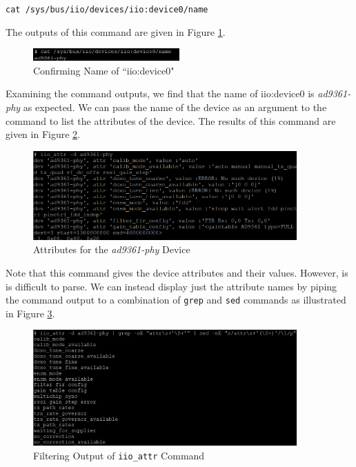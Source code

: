 \documentclass{article}
\begin{document}
\begin{center}
\texttt{cat /sys/bus/iio/devices/iio:device0/name}
\end{center}

The outputs of this command are given in Figure \ref{fig::iio_device0_name}.

\begin{figure}[H]
	\centerline{\includegraphics[width=0.5\textwidth]{iio_device0_name.png}}
	\caption{Confirming Name of ``iio:device0"}
	\label{fig::iio_device0_name}
\end{figure}

Examining the command outputs, we find that the name of iio:device0 is \textit{ad9361-phy} as expected. We can pass the name of the device as an argument to the  command to list the attributes of the device. The results of this command are given in Figure \ref{fig::iio_raw_attributes}.

\begin{figure}[H]
	\centerline{\includegraphics[width=0.9\textwidth]{iio_raw_attributes.png}}
	\caption{Attributes for the \textit{ad9361-phy} Device}
	\label{fig::iio_raw_attributes}
\end{figure}

Note that this command gives the device attributes and their values. However, is is difficult to parse. We can instead display just the attribute names by piping the command output to a combination of \texttt{grep} and \texttt{sed} commands as illustrated in Figure \ref{fig::iio_filtered_attributes}.

\begin{figure}[H]
	\centerline{\includegraphics[width=0.9\textwidth]{iio_filtered_attributes.png}}
	\caption{Filtering Output of \texttt{iio\_attr} Command}
	\label{fig::iio_filtered_attributes}
\end{figure}
\end{document}
